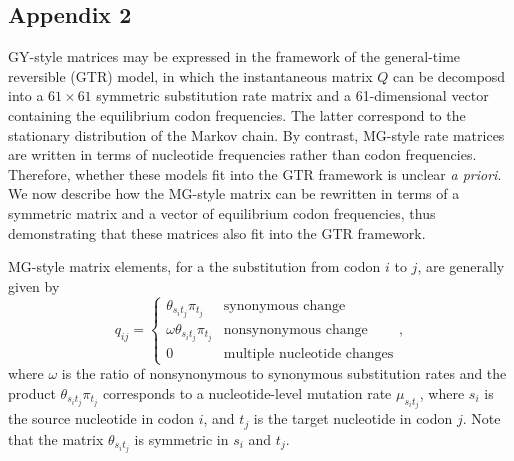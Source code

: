 \documentclass{pnastwo}
\begin{document}
\begin{article}
\section*{Appendix 2}
GY-style matrices may be expressed in the framework of the general-time reversible (GTR) model, in which the instantaneous matrix $Q$ can be decomposd into a $61 \times 61$ symmetric substitution rate matrix and a 61-dimensional vector containing the equilibrium codon frequencies. The latter correspond to the stationary distribution of the Markov chain. By contrast, MG-style rate matrices are written in terms of nucleotide frequencies rather than codon frequencies. Therefore, whether these models fit into the GTR framework is unclear \emph{a priori}. We now describe how the MG-style matrix can be rewritten in terms of a symmetric matrix and a vector of equilibrium codon frequencies, thus demonstrating that these matrices also fit into the GTR framework.
 
MG-style matrix elements, for a the substitution from codon $i$ to $j$, are generally given by 
\begin{equation}\label{eq:MGstyle}
q_{ij} = \left\{ 
\begin{array}{rl}
\theta_{s_it_j}\pi_{t_j}          &\text{synonymous change} \\
\omega \theta_{s_it_j}\pi_{t_j}   &\text{nonsynonymous change} \\
0                             &\text{multiple nucleotide changes}       
\end{array} \right. ,
\end{equation} where $\omega$ is the ratio of nonsynonymous to synonymous substitution rates and the product $\theta_{s_it_j}\pi_{t_j}$ corresponds to a nucleotide-level mutation rate $\mu_{s_it_j}$, where $s_i$ is the source nucleotide in codon $i$, and $t_j$ is the target nucleotide in codon $j$. Note that the matrix $\theta_{s_it_j}$ is symmetric in $s_i$ and $t_j$.


\end{article}
\end{document}

